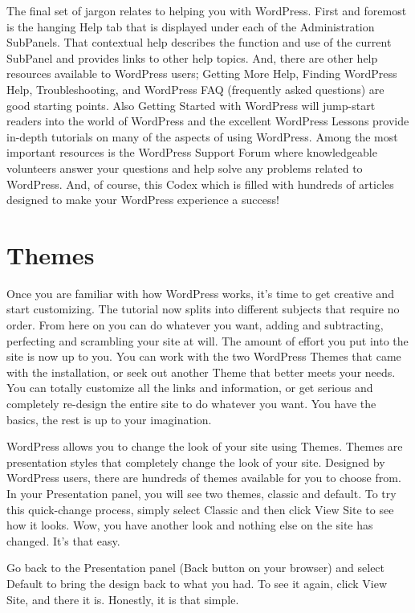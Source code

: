 The final set of jargon relates to helping you with WordPress. First and foremost is the hanging Help tab that is displayed under each of the Administration SubPanels. That contextual help describes the function and use of the current SubPanel and provides links to other help topics. And, there are other help resources available to WordPress users; Getting More Help, Finding WordPress Help, Troubleshooting, and WordPress FAQ (frequently asked questions) are good starting points. Also Getting Started with WordPress will jump-start readers into the world of WordPress and the excellent WordPress Lessons provide in-depth tutorials on many of the aspects of using WordPress. Among the most important resources is the WordPress Support Forum where knowledgeable volunteers answer your questions and help solve any problems related to WordPress. And, of course, this Codex which is filled with hundreds of articles designed to make your WordPress experience a success!




\chapter{Themes}

Once you are familiar with how WordPress works, it's time to get creative and start customizing. The tutorial now splits into different subjects that require no order. From here on you can do whatever you want, adding and subtracting, perfecting and scrambling your site at will. The amount of effort you put into the site is now up to you. You can work with the two WordPress Themes that came with the installation, or seek out another Theme that better meets your needs. You can totally customize all the links and information, or get serious and completely re-design the entire site to do whatever you want. You have the basics, the rest is up to your imagination.

WordPress allows you to change the look of your site using Themes. Themes are presentation styles that completely change the look of your site. Designed by WordPress users, there are hundreds of themes available for you to choose from. In your Presentation panel, you will see two themes, classic and default. To try this quick-change process, simply select Classic and then click View Site to see how it looks. Wow, you have another look and nothing else on the site has changed. It's that easy.

Go back to the Presentation panel (Back button on your browser) and select Default to bring the design back to what you had. To see it again, click View Site, and there it is. Honestly, it is that simple.

